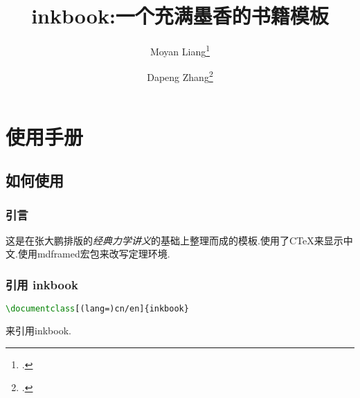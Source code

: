 \documentclass[cn]{inkbook}
\title{\textsf{inkbook}:一个充满墨香的书籍模板}
\author{Moyan Liang\thanks{\aka{梁莫言}.} \and Dapeng Zhang\thanks{\aka{张大鹏}.}}
\begin{document}
    \maketitle
    \tableofcontents
    \part{使用手册}
    
    \chapter{如何使用}
    \section{引言}
    这是在张大鹏排版的\textit{经典力学讲义}的基础上整理而成的模板.使用了C\TeX{}来显示中文.使用\textsf{mdframed}宏包来改写定理环境.
    \section{引用 \textsf{inkbook}}
    \begin{lstlisting}[language=TeX]
        \documentclass[(lang=)cn/en]{inkbook}
    \end{lstlisting}
    来引用\textsf{inkbook}.
\end{document}
